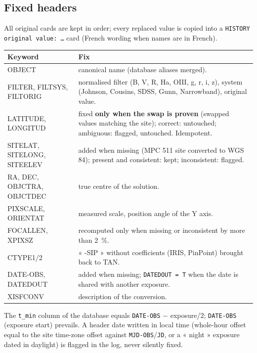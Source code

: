 \subsection{Fixed headers}\label{sec:entetes}
All original cards are kept in order; every replaced value is copied into a \texttt{HISTORY original value: …}
card (French wording when names are in French).
\begin{center}\small
\begin{tabularx}{\linewidth}{@{}>{\ttfamily}lX@{}}
\toprule
\normalfont\textbf{Keyword} & \textbf{Fix}\\
\midrule
OBJECT & canonical name (database aliases merged).\\
FILTER, FILTSYS, FILTORIG & normalised filter (B, V, R, Ha, OIII, g, r, i, z), system (Johnson, Cousins, SDSS, Gunn, Narrowband), original value.\\
LATITUDE, LONGITUD & fixed \textbf{only when the swap is proven} (swapped values matching the site); correct: untouched; ambiguous: flagged, untouched. Idempotent.\\
SITELAT, SITELONG, SITEELEV & added when missing (MPC 511 site converted to WGS 84); present and consistent: kept; inconsistent: flagged.\\
RA, DEC, OBJCTRA, OBJCTDEC & true centre of the solution.\\
PIXSCALE, ORIENTAT & measured scale, position angle of the Y axis.\\
FOCALLEN, XPIXSZ & recomputed only when missing or inconsistent by more than 2~\%.\\
CTYPE1/2 & « -SIP » without coefficients (IRIS, PinPoint) brought back to TAN.\\
DATE-OBS, DATEDOUT & added when missing; \texttt{DATEDOUT = T} when the date is shared with another exposure.\\
XISFCONV & description of the conversion.\\
\bottomrule
\end{tabularx}
\end{center}
The \texttt{t\_min} column of the database equals \texttt{DATE-OBS} − exposure/2; \texttt{DATE-OBS} (exposure
start) prevails. A header date written in local time (whole-hour offset equal to the site time-zone offset against
\texttt{MJD-OBS}/\texttt{JD}, or a « night » exposure dated in daylight) is flagged in the log, never silently
fixed.

